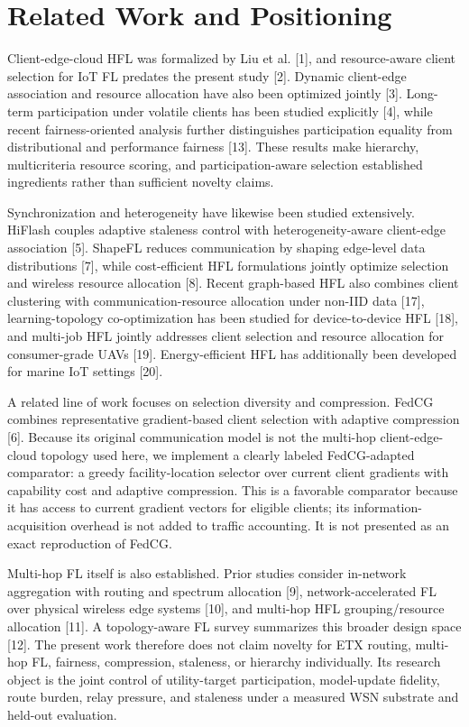 \documentclass[11pt]{article}
\begin{document}
\section{Related Work and Positioning}
Client-edge-cloud HFL was formalized by Liu et al. [1], and resource-aware client selection for IoT FL predates the present study [2]. Dynamic client-edge association and resource allocation have also been optimized jointly [3]. Long-term participation under volatile clients has been studied explicitly [4], while recent fairness-oriented analysis further distinguishes participation equality from distributional and performance fairness [13]. These results make hierarchy, multicriteria resource scoring, and participation-aware selection established ingredients rather than sufficient novelty claims.\par
Synchronization and heterogeneity have likewise been studied extensively. HiFlash couples adaptive staleness control with heterogeneity-aware client-edge association [5]. ShapeFL reduces communication by shaping edge-level data distributions [7], while cost-efficient HFL formulations jointly optimize selection and wireless resource allocation [8]. Recent graph-based HFL also combines client clustering with communication-resource allocation under non-IID data [17], learning-topology co-optimization has been studied for device-to-device HFL [18], and multi-job HFL jointly addresses client selection and resource allocation for consumer-grade UAVs [19]. Energy-efficient HFL has additionally been developed for marine IoT settings [20].\par
A related line of work focuses on selection diversity and compression. FedCG combines representative gradient-based client selection with adaptive compression [6]. Because its original communication model is not the multi-hop client-edge-cloud topology used here, we implement a clearly labeled FedCG-adapted comparator: a greedy facility-location selector over current client gradients with capability cost and adaptive compression. This is a favorable comparator because it has access to current gradient vectors for eligible clients; its information-acquisition overhead is not added to traffic accounting. It is not presented as an exact reproduction of FedCG.\par
Multi-hop FL itself is also established. Prior studies consider in-network aggregation with routing and spectrum allocation [9], network-accelerated FL over physical wireless edge systems [10], and multi-hop HFL grouping/resource allocation [11]. A topology-aware FL survey summarizes this broader design space [12]. The present work therefore does not claim novelty for ETX routing, multi-hop FL, fairness, compression, staleness, or hierarchy individually. Its research object is the joint control of utility-target participation, model-update fidelity, route burden, relay pressure, and staleness under a measured WSN substrate and held-out evaluation.\par
\end{document}
